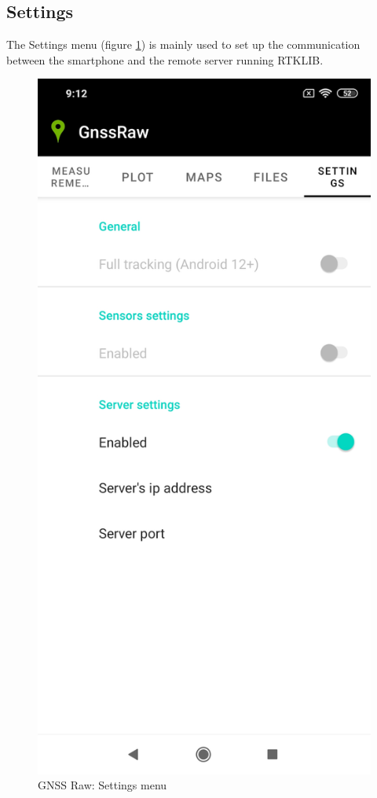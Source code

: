 \subsection*{Settings}
The Settings menu (figure \ref{FIG:gnssraw_settings}) is mainly used to set up the communication between the smartphone and the remote server running RTKLIB.

\begin{figure}[H] 
	\centering
	\includegraphics[scale=0.15,frame]{fig/gnssraw_settings.jpg} 
	\caption{GNSS Raw: Settings menu}
	\label{FIG:gnssraw_settings} 
\end{figure}

